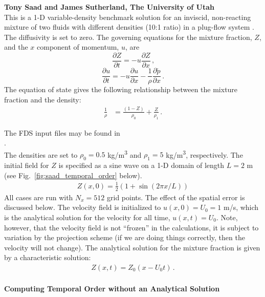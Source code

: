 \documentclass[11pt]{book}
\begin{document}
\textbf{Tony Saad and James Sutherland, The University of Utah}\\

\noindent This is a 1-D variable-density benchmark solution for an inviscid, non-reacting mixture of two fluids with different densities (10:1 ratio) in a plug-flow system \cite{Biglari:2013}.  The diffusivity is set to zero.  The governing equations for the mixture fraction, $Z$, and the $x$ component of momentum, $u$, are
\begin{equation}
\frac{\partial Z}{\partial t} = - u\frac{\partial Z}{\partial x} \,\mbox{,}
\end{equation}
\begin{equation}
\frac{\partial u}{\partial t} = - u\frac{\partial u}{\partial x} - \frac{1}{\rho} \frac{\partial \tilde{p}}{\partial x} \,\mbox{.}
\end{equation}
The equation of state gives the following relationship between the mixture fraction and the density:
\begin{align}
\frac{1}{\rho} &= \frac{(1-Z)}{\rho_0} + \frac{Z}{\rho_1} \,\mbox{.}
\end{align}

The FDS input files may be found in\\
.\\

\noindent The densities are set to $\rho_0 = 0.5$ \si{kg/m^3} and $\rho_1 = 5$ \si{kg/m^3}, respectively.  The initial field for $Z$ is specified as a sine wave on a 1-D domain of length $L=2$ m (see Fig.~\ref{fig:saad_temporal_order} below).
\begin{align}
Z(x,0) = \frac{1}{2}\left( 1 + \sin(2\pi x/L) \right)
\end{align}
All cases are run with $N_x = 512$ grid points.  The effect of the spatial error is discussed below. The velocity field is initialized to $u(x,0) = U_0 = 1$ m/s, which is the analytical solution for the velocity for all time, $u(x,t) = U_0$.  Note, however, that the velocity field is not ``frozen'' in the calculations, it is subject to variation by the projection scheme (if we are doing things correctly, then the velocity will not change).  The analytical solution for the mixture fraction is given by a characteristic solution:
\begin{align}
Z(x,t) = Z_0(x-U_0 t) \,\mbox{.}
\end{align}

\paragraph{Computing Temporal Order without an Analytical Solution}
\end{document}
